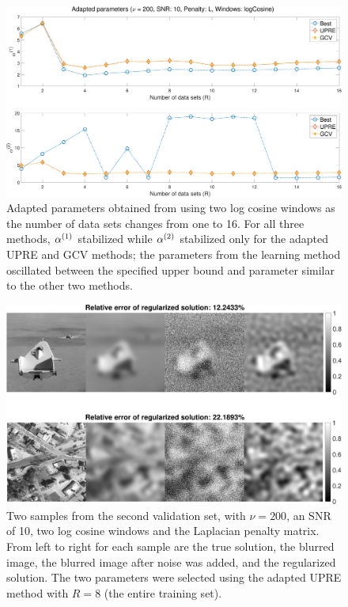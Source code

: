 \documentclass[12pt]{article}
\begin{document}
\begin{figure}[ht]
\centering
\includegraphics[width=1.0\textwidth]{Figures/Convergence_v200_SNR10_logCos2_L.pdf}
\caption{Adapted parameters obtained from using two log cosine windows as the number of data sets changes from one to 16. For all three methods, $\alpha^{(1)}$ stabilized while $\alpha^{(2)}$ stabilized only for the adapted UPRE and GCV methods; the parameters from the learning method oscillated between the specified upper bound and parameter similar to the other two methods.}
\label{fig:Convergence of Adapted Parameters}
\end{figure}

\begin{figure}[ht]
\centering
\includegraphics[width=1.0\textwidth]{Figures/Sample Solutions.pdf}
\caption{Two samples from the second validation set, with $\nu = 200$, an SNR of 10, two log cosine windows and the Laplacian penalty matrix. From left to right for each sample are the true solution, the blurred image, the blurred image after noise was added, and the regularized solution. The two parameters were selected using the adapted UPRE method with $R = 8$ (the entire training set).}
\label{fig:SampleSolutions_v200_SNR10_logCosine2_L}
\end{figure}
\end{document}
